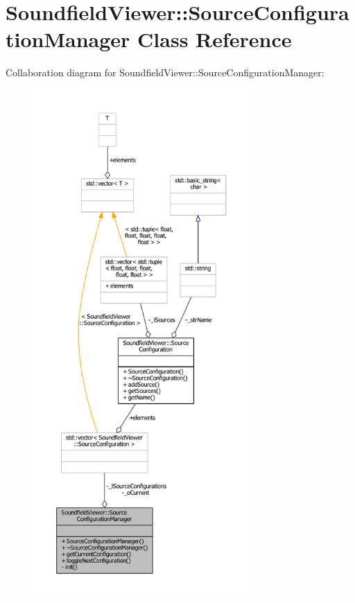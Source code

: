 \section{Soundfield\-Viewer\-:\-:Source\-Configuration\-Manager Class Reference}
\label{classSoundfieldViewer_1_1SourceConfigurationManager}


Collaboration diagram for Soundfield\-Viewer\-:\-:Source\-Configuration\-Manager\-:\nopagebreak
\begin{figure}[H]
\begin{center}
\leavevmode
\includegraphics[height=550pt]{d1/d94/classSoundfieldViewer_1_1SourceConfigurationManager__coll__graph}
\end{center}
\end{figure}
